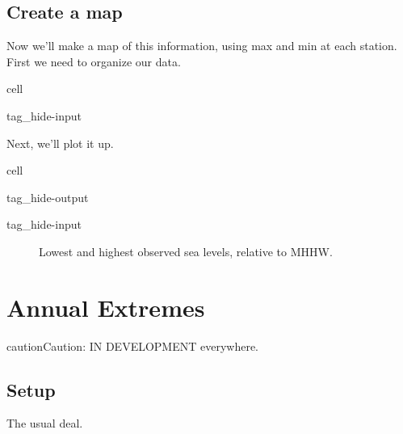 \documentclass[letterpaper,10pt,english]{jupyterBook}
\begin{document}
\chapter{Create a map}
\label{\detokenize{notebooks/regional_and_local/SL_Rankings_annual:create-a-map}}\label{\detokenize{notebooks/regional_and_local/SL_Rankings_annual:sl-rankings-map}}
\sphinxAtStartPar
Now we’ll make a map of this information, using max and min at each station. First we need to organize our data.

\begin{sphinxuseclass}{cell}
\begin{sphinxuseclass}{tag_hide-input}
\end{sphinxuseclass}
\end{sphinxuseclass}
\sphinxAtStartPar
Next, we’ll plot it up.

\begin{sphinxuseclass}{cell}
\begin{sphinxuseclass}{tag_hide-output}
\begin{sphinxuseclass}{tag_hide-input}
\end{sphinxuseclass}
\end{sphinxuseclass}
\end{sphinxuseclass}
\begin{figure}[htbp]
\centering
\capstart

\noindent{}
\caption{Lowest and highest observed sea levels, relative to MHHW.}\label{\detokenize{notebooks/regional_and_local/SL_Rankings_annual:id1}}\end{figure}

\sphinxstepscope


\part{Annual Extremes}
\label{\detokenize{notebooks/regional_and_local/SL_Extremes_annual:annual-extremes}}\label{\detokenize{notebooks/regional_and_local/SL_Extremes_annual::doc}}
\begin{sphinxadmonition}{caution}{Caution:}
\sphinxAtStartPar
IN DEVELOPMENT everywhere.
\end{sphinxadmonition}


\chapter{Setup}
\label{\detokenize{notebooks/regional_and_local/SL_Extremes_annual:setup}}
\sphinxAtStartPar
The usual deal.
\end{document}
